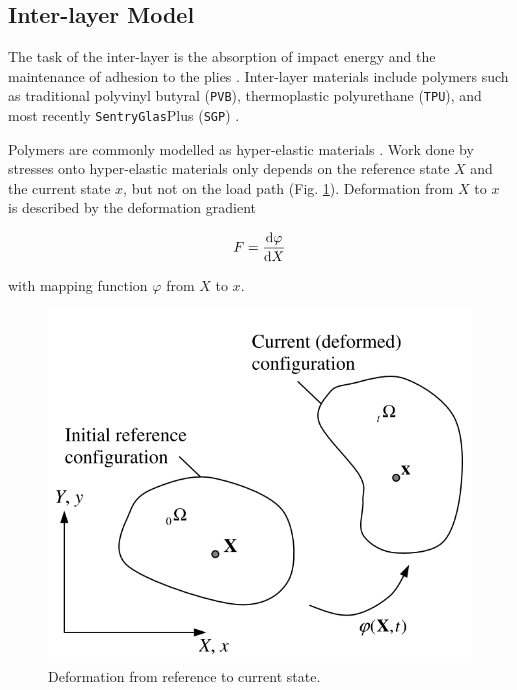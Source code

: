 \documentclass[12pt,twoside]{article}
\theoremstyle{break}
\begin{document}
\subsection{Inter-layer Model}

The task of the inter-layer is the absorption of impact energy and the maintenance of adhesion to the plies \cite{Wu14}. Inter-layer materials include polymers such as traditional polyvinyl butyral (\texttt{PVB}), thermoplastic polyurethane (\texttt{TPU}), and most recently \texttt{SentryGlas}\textregistered Plus (\texttt{SGP}) \cite{Moh18, Wan18}. 

\bigbreak
Polymers are commonly modelled as hyper-elastic materials \cite{Gha15}. Work done by stresses onto hyper-elastic materials only depends on the reference state $X$ and the current state $x$, but not on the load path (Fig. \ref{fig:deformation}). Deformation from $X$ to $x$ is described by the deformation gradient \cite{Gu07}

\begin{equation}
    \label{eq:defgrad}
    F = \frac{{\rm{d}}\varphi}{{\rm{d}}X}
\end{equation}

with mapping function $\varphi$ from $X$ to $x$.

\begin{figure}[h!]
    \centering
    \includegraphics[width=\textwidth*2/3]{Deformation}
    \caption{Deformation from reference to current state. \cite{Gu07}}
    \label{fig:deformation}
\end{figure}
\end{document}
